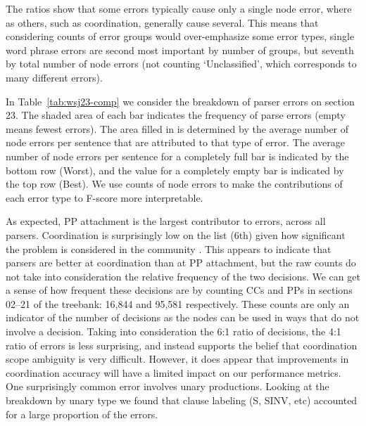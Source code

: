 The ratios show that some errors typically cause only a single node error, where as others, such as coordination, generally cause several.
This means that considering counts of error groups would over-emphasize some error types, \myeg single word phrase errors are second most important by number of groups, but seventh by total number of node errors (not counting `Unclassified', which corresponds to many different errors).

In Table~\ref{tab:wsj23-comp} we consider the breakdown of parser errors on \wsj section 23.
The shaded area of each bar indicates the frequency of parse errors (\myie empty means fewest errors).
The area filled in is determined by the average number of node errors per sentence that are attributed to that type of error.
The average number of node errors per sentence for a completely full bar is indicated by the bottom row (Worst), and the value for a completely empty bar is indicated by the top row (Best).
We use counts of node errors to make the contributions of each error type to F-score more interpretable.

As expected, PP attachment is the largest contributor to errors, across all parsers.
Coordination is surprisingly low on the list (6th) given how significant the problem is considered in the community \parencite{N06-1020}.
This appears to indicate that parsers are better at coordination than at PP attachment, but the raw counts do not take into consideration the relative frequency of the two decisions.
We can get a sense of how frequent these decisions are by counting CCs and PPs in sections 02--21 of the treebank: 16,844 and 95,581 respectively.
These counts are only an indicator of the number of decisions as the nodes can be used in ways that do not involve a decision.
Taking into consideration the 6:1 ratio of decisions, the 4:1 ratio of errors is less surprising, and instead supports the belief that coordination scope ambiguity is very difficult.
However, it does appear that improvements in coordination accuracy will have a limited impact on our performance metrics.
One surprisingly common error involves unary productions.
Looking at the breakdown by unary type we found that clause labeling (S, SINV, etc) accounted for a large proportion of the errors.

\begin{landscape}

\end{landscape}

